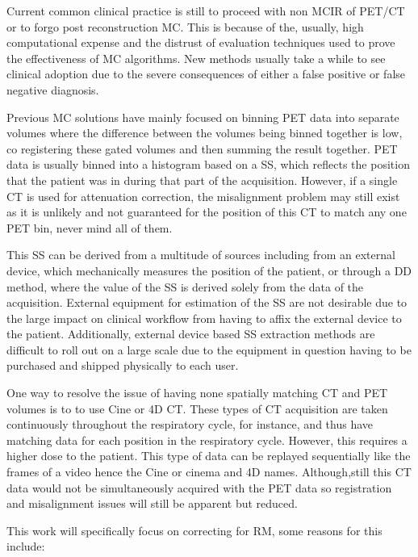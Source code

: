         Current common clinical practice is still to proceed with non \gls{MCIR} of \gls{PET}/\gls{CT} or to forgo post reconstruction \gls{MC}. This is because of the, usually, high computational expense and the distrust of evaluation techniques used to prove the effectiveness of \gls{MC} algorithms. New methods usually take a while to see clinical adoption due to the severe consequences of either a false positive or false negative diagnosis.
        
        Previous \gls{MC} solutions have mainly focused on binning \gls{PET} data into separate volumes where the difference between the volumes being binned together is low, co registering these gated volumes and then summing the result together. \gls{PET} data is usually binned into a histogram based on a \gls{SS}, which reflects the position that the patient was in during that part of the acquisition. However, if a single \gls{CT} is used for attenuation correction, the misalignment problem may still exist as it is unlikely and not guaranteed for the position of this \gls{CT} to match any one \gls{PET} bin, never mind all of them.
        
        This \gls{SS} can be derived from a multitude of sources including from an external device, which mechanically measures the position of the patient, or through a \gls{DD} method, where the value of the \gls{SS} is derived solely from the data of the acquisition. External equipment for estimation of the \gls{SS} are not desirable due to the large impact on clinical workflow from having to affix the external device to the patient. Additionally, external device based \gls{SS} extraction methods are difficult to roll out on a large scale due to the equipment in question having to be purchased and shipped physically to each user.
        
        One way to resolve the issue of having none spatially matching \gls{CT} and \gls{PET} volumes is to to use Cine or \gls{4D} \gls{CT}. These types of \gls{CT} acquisition are taken continuously throughout the respiratory cycle, for instance, and thus have matching data for each position in the respiratory cycle. However, this requires a higher dose to the patient. This type of data can be replayed sequentially like the frames of a video hence the Cine or cinema and \gls{4D} names. Although,still this \gls{CT} data would not be simultaneously acquired with the \gls{PET} data so registration and misalignment issues will still be apparent but reduced. 
        
        This work will specifically focus on correcting for \gls{RM}, some reasons for this include:
        
